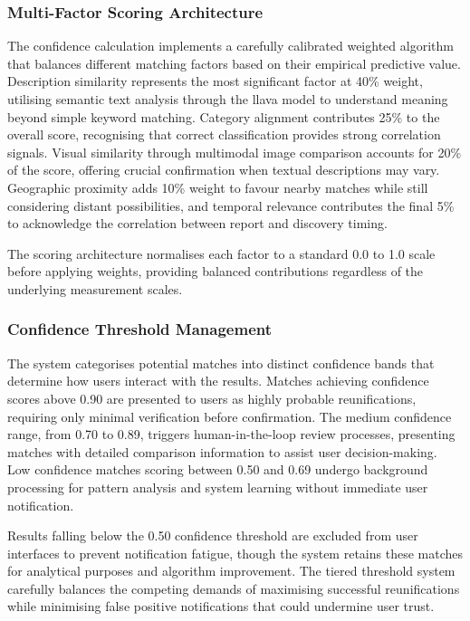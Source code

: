 \subsubsection{Multi-Factor Scoring Architecture}

The confidence calculation implements a carefully calibrated weighted algorithm that balances different matching factors based on their empirical predictive value. Description similarity represents the most significant factor at 40\% weight, utilising semantic text analysis through the \ac{llava} model to understand meaning beyond simple keyword matching. Category alignment contributes 25\% to the overall score, recognising that correct classification provides strong correlation signals. Visual similarity through multimodal image comparison accounts for 20\% of the score, offering crucial confirmation when textual descriptions may vary. Geographic proximity adds 10\% weight to favour nearby matches while still considering distant possibilities, and temporal relevance contributes the final 5\% to acknowledge the correlation between report and discovery timing.

The scoring architecture normalises each factor to a standard 0.0 to 1.0 scale before applying weights, providing balanced contributions regardless of the underlying measurement scales.


\subsubsection{Confidence Threshold Management}

The system categorises potential matches into distinct confidence bands that determine how users interact with the results. Matches achieving confidence scores above 0.90 are presented to users as highly probable reunifications, requiring only minimal verification before confirmation. The medium confidence range, from 0.70 to 0.89, triggers human-in-the-loop review processes, presenting matches with detailed comparison information to assist user decision-making. Low confidence matches scoring between 0.50 and 0.69 undergo background processing for pattern analysis and system learning without immediate user notification.

Results falling below the 0.50 confidence threshold are excluded from user interfaces to prevent notification fatigue, though the system retains these matches for analytical purposes and algorithm improvement. The tiered threshold system carefully balances the competing demands of maximising successful reunifications while minimising false positive notifications that could undermine user trust.

